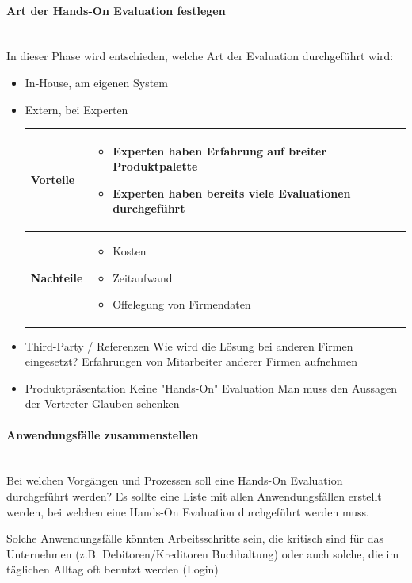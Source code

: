 \documentclass[a4paper, 11pt]{article}
\renewcommand*{\thead}[1]{\bfseries #1}
\begin{document}
\paragraph{Art der Hands-On Evaluation festlegen}\mbox{}\\
In dieser Phase wird entschieden, welche Art der Evaluation durchgeführt wird: 

\begin{itemize}
	\item In-House, am eigenen System
	\item Extern, bei Experten \\
		\begin{tabular}{|l|p{12cm}|}
			\hline
			\thead{Vorteile}& 
				\begin{itemize}
					\item Experten haben Erfahrung auf breiter Produktpalette
					\item Experten haben bereits viele Evaluationen durchgeführt
				\end{itemize}\\
			\hline
			\thead{Nachteile}&
				\begin{itemize}
					\item Kosten
					\item Zeitaufwand
					\item Offelegung von Firmendaten
				\end{itemize}\\
			\hline
		\end{tabular}
	\item Third-Party / Referenzen
		\subitem Wie wird die Lösung bei anderen Firmen eingesetzt?
		\subitem Erfahrungen von Mitarbeiter anderer Firmen aufnehmen
	\item Produktpräsentation
		\subitem Keine "Hands-On" Evaluation
		\subitem Man muss den Aussagen der Vertreter Glauben schenken
\end{itemize}

\paragraph{Anwendungsfälle zusammenstellen}\mbox{}\\
Bei welchen Vorgängen und Prozessen soll eine Hands-On Evaluation durchgeführt werden? Es sollte eine Liste mit allen Anwendungsfällen erstellt werden, bei welchen eine Hands-On Evaluation durchgeführt werden muss.

Solche Anwendungsfälle könnten Arbeitsschritte sein, die kritisch sind für das Unternehmen (z.B. Debitoren/Kreditoren Buchhaltung) oder auch solche, die im täglichen Alltag oft benutzt werden (Login)
\end{document}
